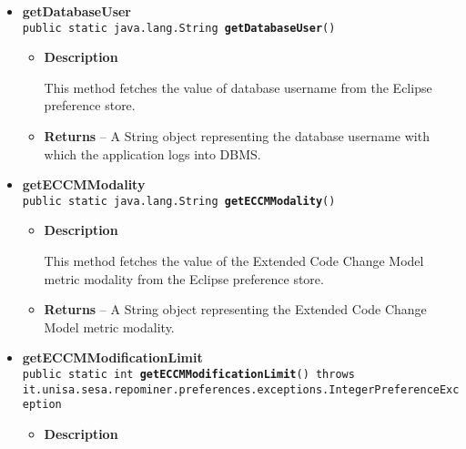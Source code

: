 {{{{{{{{{\begin{itemize}
{\begin{itemize}
{This method fetches the value of database port from the Eclipse preference store.
}
\item{{\bf  Returns} -- 
A int value representing the port on which the DBMS is listening to. 
}%
\end{itemize}
}%
\item{ 
\hypertarget{it.unisa.sesa.repominer.preferences.Preferences.getDatabaseUser()}{{\bf  getDatabaseUser}\\}
\texttt{public static java.lang.String\ {\bf  getDatabaseUser}()
\label{it.unisa.sesa.repominer.preferences.Preferences.getDatabaseUser()}}%
\begin{itemize}
\item{
{\bf  Description}

This method fetches the value of database username from the Eclipse preference store.
}
\item{{\bf  Returns} -- 
A String object representing the database username with which the application logs into DBMS. 
}%
\end{itemize}
}%
\item{ 
\hypertarget{it.unisa.sesa.repominer.preferences.Preferences.getECCMModality()}{{\bf  getECCMModality}\\}
\texttt{public static java.lang.String\ {\bf  getECCMModality}()
\label{it.unisa.sesa.repominer.preferences.Preferences.getECCMModality()}}%
\begin{itemize}
\item{
{\bf  Description}

This method fetches the value of the Extended Code Change Model metric modality from the Eclipse preference store.
}
\item{{\bf  Returns} -- 
A String object representing the Extended Code Change Model metric modality. 
}%
\end{itemize}
}%
\item{ 
\hypertarget{it.unisa.sesa.repominer.preferences.Preferences.getECCMModificationLimit()}{{\bf  getECCMModificationLimit}\\}
\texttt{public static int\ {\bf  getECCMModificationLimit}() throws it.unisa.sesa.repominer.preferences.exceptions.IntegerPreferenceException
\label{it.unisa.sesa.repominer.preferences.Preferences.getECCMModificationLimit()}}%
\begin{itemize}
\item{
{\bf  Description}

}
\end{itemize}}
\end{itemize}}}}}}}}}}
